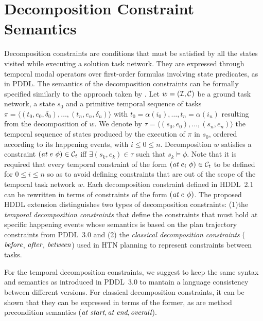 \documentclass[letterpaper]{article} %
\newcommand{\at}{\text{\it at}}
\newcommand{\before}{\text{\it before}}
\newcommand{\after}{\text{\it after}}
\renewcommand{\between}{\text{\it between}}
\newcommand{\atstart}{\text{\it at start}}
\newcommand{\atend}{\text{\it at end}}
\newcommand{\overall}{\text{\it overall}}
\begin{document}
\section{Decomposition Constraint Semantics}
\label{Sec:Decomposition-Constraints-Semantics}

Decomposition constraints are conditions that must be satisfied by all the states visited while executing a solution task network. They are expressed through temporal modal operators over first-order formulas involving state predicates, as in PDDL. The semantics of the decomposition constraints can be formally specified similarly to the approach taken by \citet{gerevini05}. Let $w = ({\cal{I}}, {\cal{C}})$ be a ground task network, a state $s_0$ and a primitive temporal sequence of tasks $\pi = \langle (t_0, e_0, \delta_0), \ldots, (t_n, e_n, \delta_n) \rangle $ with $t_0 = \alpha(i_0), \ldots, t_n = \alpha(i_n)$ resulting from the decomposition of $w$.
We denote by $\tau = \langle (s_0, e_0), \ldots, (s_n, e_n) \rangle$ the  temporal sequence of states produced by the execution of $\pi$ in $s_0$, ordered according to its happening events, with \mbox{$i \leq 0 \leq n$}. Decomposition $w$ satisfies a constraint $(\at \ e \ \phi) \in {\cal{C}}_t$ iff $\exists (s_k, e_k) \in \tau$ such that $s_k \models \phi$. %
%
Note that it is required that every temporal constraint of the form $(\at \ e_i \ \phi) \in {\cal{C}}_t$ to be defined for $0 \leq i \leq n$ so as to avoid defining constraints that are out of the scope of the temporal task network $w$. Each decomposition constraint defined in HDDL~2.1 can be rewritten in terms of constraints of the form $(\at \ e\ \phi)$. The proposed HDDL extension distinguishes two types of decomposition constraints: (1)the \emph{temporal decomposition constraints} that define the constraints that must hold at specific happening events whose semantics is based on the plan trajectory constraints from PDDL~3.0 \cite{gerevini05} and (2) the \emph{classical decomposition constraints} ($\before$, $\after$, $\between$) used in HTN planning \citep{erol94} to represent constraints between tasks.

For the temporal decomposition constraints, we suggest to keep the same syntax and semantics as introduced in PDDL~3.0 to mantain a language consistency between different versions.
For classical decomposition constraints, it can be shown that they can be expressed in terms of the former, as are method precondition semantics ($\atstart, \atend, \overall$).
\end{document}
